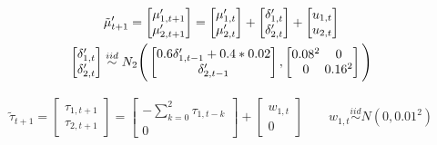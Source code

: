 \documentclass[twoside,11pt]{article}
\begin{document}
\begin{equation} \label{eq:sim-mu2}
\begin{gathered}
\tilde{\mu}^\prime_{t+1}=\begin{bmatrix}
\mu_{1,t+1}^\prime  \\
\mu_{2,t+1}^\prime
\end{bmatrix}=\begin{bmatrix}
\mu_{1,t}^\prime  \\
\mu_{2,t}^\prime
\end{bmatrix}+\begin{bmatrix}
\delta_{1,t}^\prime  \\
\delta_{2,t}^\prime
\end{bmatrix}+\begin{bmatrix}
u_{1,t}  \\
u_{2,t}
\end{bmatrix} \\
\begin{bmatrix}
\delta_{1,t}^\prime  \\
\delta_{2,t}^\prime
\end{bmatrix}\stackrel{iid}\sim N_2\Bigg(
\begin{bmatrix}
0.6\delta_{1,t-1}^\prime+0.4*0.02  \\
\delta_{2,t-1}^\prime
\end{bmatrix},
\begingroup %
\setlength\arraycolsep{1.8pt}
\begin{bmatrix}
0.08^2&0\\
0&0.16^2
\end{bmatrix}
\endgroup\Bigg)
\end{gathered}
\end{equation}

\begin{equation} \label{eq:sim-seasonal}
\begin{gathered}
\tilde{\tau}_{t+1}=\begin{bmatrix}
\tau_{1,t+1}  \\
\tau_{2,t+1}
\end{bmatrix}=\begin{bmatrix}
-\sum_{k=0}^{2}\tau_{1,t-k}  \\
0
\end{bmatrix}+\begin{bmatrix}
w_{1,t}  \\
0
\end{bmatrix}\quad \quad
w_{1,t}\stackrel{iid}\sim N(0,0.01^2)
\end{gathered}
\end{equation}
\end{document}

